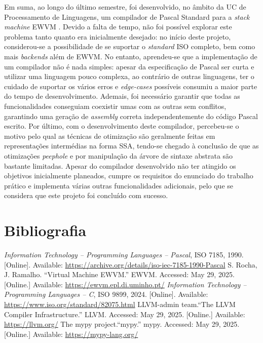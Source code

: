 \documentclass[12pt, a4paper]{article}
\begin{document}
Em suma, ao longo do último semestre, foi desenvolvido, no âmbito da UC de Processamento de
Linguagens, um compilador de Pascal Standard \cite{iso} para a \emph{stack machine} EWVM
\cite{ewvm}. Devido a falta de tempo, não foi possível explorar este problema tanto quanto era
inicialmente desejado: no início deste projeto, considerou-se a possibilidade de se suportar o
\emph{standard} ISO completo, bem como mais \emph{backends} além de EWVM. No entanto, aprendeu-se
que a implementação de um compilador não é nada simples: apesar da especificação de Pascal ser
curta e utilizar uma linguagem pouco complexa, ao contrário de outras linguagens, ter o cuidado
de suportar os vários erros e \emph{edge-cases} possíveis consumiu a maior parte do tempo de
desenvolvimento. Ademais, foi necessário garantir que todas as funcionalidades conseguiam coexistir
umas com as outras sem conflitos, garantindo uma geração de \emph{assembly} correta
independentemente do código Pascal escrito. Por último, com o desenvolvimento deste compilador,
percebeu-se o motivo pelo qual as técnicas de otimização são geralmente feitas em representações
intermédias na forma SSA, tendo-se chegado à conclusão de que as otimizações \emph{peephole} e por
manipulação da árvore de sintaxe abstrata são bastante limitadas. Apesar do compilador desenvolvido
não ter atingido os objetivos inicialmente planeados, cumpre os requisitos do enunciado do trabalho
prático e implementa várias outras funcionalidades adicionais, pelo que se considera que este
projeto foi concluído com sucesso.

\begingroup
\section{Bibliografia}
\renewcommand{\section}[2]{}

\begin{thebibliography}{9}
        \emph{Information Technology -- Programming Languages -- Pascal}, ISO 7185, 1990. [Online].
        Available: \url{https://archive.org/details/iso-iec-7185-1990-Pascal}
        S. Rocha, J. Ramalho. ``Virtual Machine EWVM.'' EWVM. Accessed: May 29, 2025. [Online.]
        Available: \url{https://ewvm.epl.di.uminho.pt/}
        \emph{Information Technology -- Programming Languages -- C}, ISO 9899, 2024. [Online].
        Available: \url{https://www.iso.org/standard/82075.html}
        LLVM-admin team.``The LLVM Compiler Infrastructure.'' LLVM. Accessed: May 29, 2025.
        [Online.] Available: \url{https://llvm.org/}
        The mypy project.``mypy.'' mypy. Accessed: May 29, 2025. [Online.] Available:
        \url{https://mypy-lang.org/}
\end{thebibliography}
\endgroup
\end{document}

